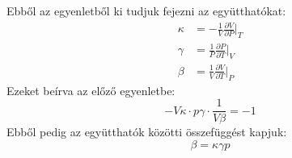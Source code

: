 \documentclass[../main.tex]{subfiles}
\begin{document}
Ebből az egyenletből ki tudjuk fejezni az együtthatókat:
\begin{equation}
    \begin{aligned}
        \kappa &= -\frac{1}{V} \frac{\partial V}{\partial P}\bigg|_{T} \\
        \gamma &= \frac{1}{P} \frac{\partial P}{\partial T}\bigg|_{V} \\
        \beta &= \frac{1}{V} \frac{\partial V}{\partial T}\bigg|_{P}
    \end{aligned}
\end{equation}
Ezeket beírva az előző egyenletbe:
\begin{equation}
    -V\kappa \cdot p\gamma \cdot \frac{1}{V\beta} = -1
\end{equation}
Ebből pedig az együtthatók közötti összefüggést kapjuk:
\begin{equation}
   \beta = \kappa \gamma p
\end{equation}
\end{document}
